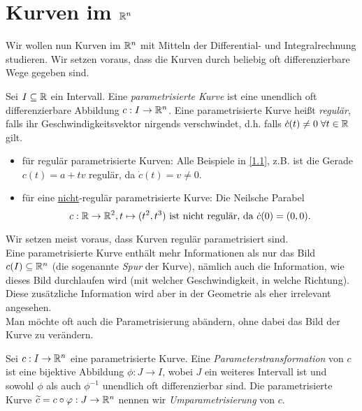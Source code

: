 \documentclass[11pt]{scrbook}
\begin{document}
\section{Kurven im $\mathbb{R}^n$}
Wir wollen nun Kurven im $\mathbb{R}^n$ mit Mitteln der Differential- und Integralrechnung studieren. Wir setzen voraus, dass die Kurven durch beliebig oft differenzierbare Wege gegeben sind.

\begin{df}
Sei $I \subseteq \mathbb{R}$ ein Intervall. Eine \emph{parametrisierte Kurve} ist eine unendlich oft differenzierbare Abbildung $c: I \to \mathbb{R}^n$. Eine parametrisierte Kurve heißt \emph{regulär}, falls ihr Geschwindigkeitsvektor nirgends verschwindet, d.h. falls $\dot c (t) \neq 0 \; \forall t \in \mathbb{R}$ gilt.
\end{df}

\begin{ex*}
\begin{itemize}
	\item für regulär parametrisierte Kurven: Alle Beispiele in \ref{1.1}, z.B. ist die Gerade $c(t) = a+tv$ regulär, da $\dot c(t) = v \neq 0$.
	\item  für eine \underline{nicht}-regulär parametrisierte Kurve: Die Neilsche Parabel \[ c:\mathbb{R} \to \mathbb{R}^2, t \mapsto (t^2, t^3) \text{ ist nicht regulär, da } \dot c(0) = (0,0). \]
\end{itemize}
\end{ex*}

\begin{note}
Wir setzen meist voraus, dass Kurven regulär parametrisiert sind. \\
Eine parametrisierte Kurve enthält mehr Informationen als nur das Bild $c(I) \subseteq \mathbb{R}^n$ (die sogenannte \emph{Spur} der Kurve), nämlich auch die Information, wie dieses Bild durchlaufen wird (mit welcher Geschwindigkeit, in welche Richtung). Diese zusätzliche Information wird aber in der Geometrie als eher irrelevant angesehen. \\
Man möchte oft auch die Parametrisierung abändern, ohne dabei das Bild der Kurve zu verändern.
\end{note}

\begin{df}
Sei $c: I \to \mathbb{R}^n$ eine parametrisierte Kurve. Eine \emph{Parameterstransformation} von $c$ ist eine bijektive Abbildung $\phi: J \to I$, wobei $J$ ein weiteres Intervall ist und sowohl $\phi$ als auch $\phi^{-1}$ unendlich oft differenzierbar sind. Die parametrisierte Kurve $\widetilde c = c \circ \varphi : J \to \mathbb{R}^n$ nennen wir \emph{Umparametrisierung} von $c$. 
\end{df}
\end{document}
